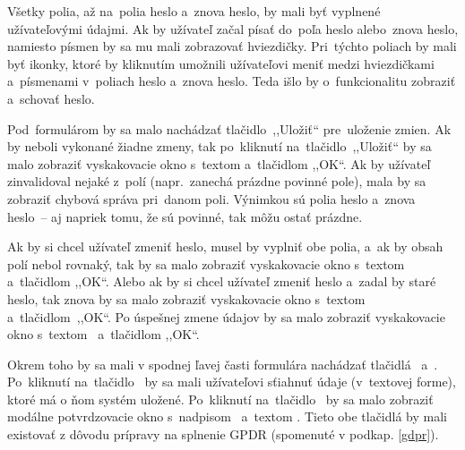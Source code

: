 Všetky polia, až na~polia heslo a~znova heslo, by mali byť vyplnené užívateľovými údajmi. Ak by užívateľ začal písať do~poľa heslo alebo~znova heslo, namiesto písmen by sa mu mali zobrazovať hviezdičky. Pri~týchto poliach by mali byť ikonky, ktoré by kliknutím umožnili užívateľovi meniť medzi hviezdičkami a~písmenami v~poliach heslo a~znova heslo. Teda išlo by o~funkcionalitu zobraziť a~schovať heslo.

Pod~formulárom by sa malo nachádzať tlačidlo~,,Uložiť`` pre~uloženie zmien. Ak by neboli vykonané žiadne zmeny, tak po~kliknutí na~tlačidlo~,,Uložiť`` by sa malo zobraziť vyskakovacie okno s~textom  a~tlačidlom ,,OK``. Ak by užívateľ zinvalidoval nejaké z~polí (napr.~zanechá prázdne povinné pole), mala by sa zobraziť chybová správa pri~danom poli. Výnimkou sú polia heslo a~znova heslo~-- aj napriek tomu, že sú povinné, tak môžu ostať prázdne.

Ak by si chcel užívateľ zmeniť heslo, musel by vyplniť obe polia, a~ak by obsah polí nebol rovnaký, tak by sa malo zobraziť vyskakovacie okno s~textom~ a~tlačidlom ,,OK``. Alebo ak by si chcel užívateľ zmeniť heslo a~zadal by staré heslo, tak znova by sa malo zobraziť vyskakovacie okno s~textom~ a~tlačidlom~,,OK``. Po úspešnej zmene údajov by sa malo zobraziť vyskakovacie okno s~textom~ a~tlačidlom ,,OK``.

Okrem toho by sa mali v spodnej ľavej časti formulára nachádzať tlačidlá~ a~. Po~kliknutí na~tlačidlo~ by sa mali užívateľovi sťiahnuť údaje (v~textovej forme), ktoré má o ňom systém uložené. Po~kliknutí na~tlačidlo~ by sa malo zobraziť modálne potvrdzovacie okno s~nadpisom~ a~textom . Tieto obe tlačidlá by mali existovať z dôvodu prípravy na splnenie GPDR (spomenuté v podkap. \ref{gdpr}).

